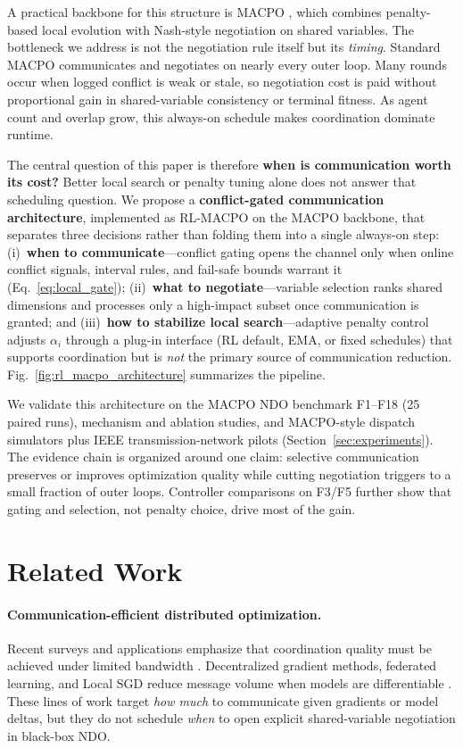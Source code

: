 \documentclass[conference]{IEEEtran}
\begin{document}
A practical backbone for this structure is MACPO \cite{ref_macpo}, which combines penalty-based local evolution with Nash-style negotiation on shared variables. The bottleneck we address is not the negotiation rule itself but its \emph{timing}. Standard MACPO communicates and negotiates on nearly every outer loop. Many rounds occur when logged conflict is weak or stale, so negotiation cost is paid without proportional gain in shared-variable consistency or terminal fitness. As agent count and overlap grow, this always-on schedule makes coordination dominate runtime.

The central question of this paper is therefore \textbf{when is communication worth its cost?} Better local search or penalty tuning alone does not answer that scheduling question. We propose a \textbf{conflict-gated communication architecture}, implemented as RL-MACPO on the MACPO backbone, that separates three decisions rather than folding them into a single always-on step: (i)~\textbf{when to communicate}---conflict gating opens the channel only when online conflict signals, interval rules, and fail-safe bounds warrant it (Eq.~\eqref{eq:local_gate}); (ii)~\textbf{what to negotiate}---variable selection ranks shared dimensions and processes only a high-impact subset once communication is granted; and (iii)~\textbf{how to stabilize local search}---adaptive penalty control adjusts $\alpha_i$ through a plug-in interface (RL default, EMA, or fixed schedules) that supports coordination but is \emph{not} the primary source of communication reduction. Fig.~\ref{fig:rl_macpo_architecture} summarizes the pipeline.

We validate this architecture on the MACPO NDO benchmark F1--F18 (25 paired runs), mechanism and ablation studies, and MACPO-style dispatch simulators plus IEEE transmission-network pilots (Section~\ref{sec:experiments}). The evidence chain is organized around one claim: selective communication preserves or improves optimization quality while cutting negotiation triggers to a small fraction of outer loops. Controller comparisons on F3/F5 further show that gating and selection, not penalty choice, drive most of the gain.

\section{Related Work}\label{sec:related}
\paragraph{Communication-efficient distributed optimization.}
Recent surveys and applications emphasize that coordination quality must be achieved under limited bandwidth \cite{ref_decentralized_review_2023,ref_dopt_robotics_2024,ref_dopt_smartgrid_2024,ref_ndo_dispatch_2024}. Decentralized gradient methods, federated learning, and Local SGD reduce message volume when models are differentiable \cite{ref_koloskova_decsgd_2020,ref_mcmahan_fedavg_2017,ref_stich_local_sgd_2019,ref_kairouz_flsurvey_2021}. These lines of work target \emph{how much} to communicate given gradients or model deltas, but they do not schedule \emph{when} to open explicit shared-variable negotiation in black-box NDO.
\end{document}
